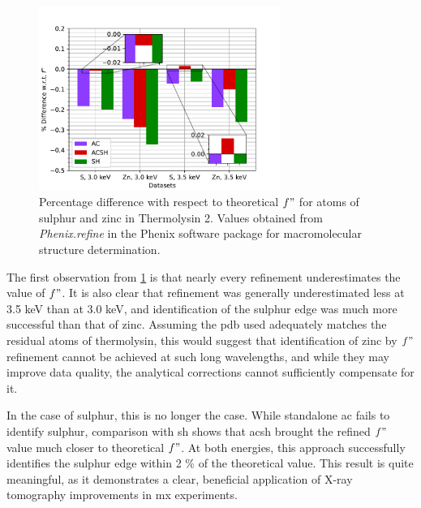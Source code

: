 \begin{figure}[h]
    \centering
    \includegraphics[width = 0.7\textwidth]{plots/exp1/tlys_2_P6122/FDP_percent_diff.pdf}
    \caption{Percentage difference with respect to theoretical $f"$ for atoms of sulphur and zinc in Thermolysin 2. Values obtained from \textit{Phenix.refine} in the Phenix software package for macromolecular structure determination.}
    \label{fig:phenix_plot}
\end{figure}

The first observation from \cref{fig:phenix_plot} is that nearly every refinement underestimates the value of $f"$. It is also clear that refinement was generally underestimated less at 3.5 \unit{keV} than at 3.0 \unit{keV}, and identification of the sulphur edge was much more successful than that of zinc. Assuming the \ac{pdb} used adequately matches the residual atoms of thermolysin, this would suggest that identification of zinc by $f"$ refinement cannot be achieved at such long wavelengths, and while they may improve data quality, the analytical corrections cannot sufficiently compensate for it. %

In the case of sulphur, this is no longer the case. While standalone \ac{ac} fails to identify sulphur, comparison with \ac{sh} shows that \ac{acsh} brought the refined $f"$ value much closer to theoretical $f"$. At both energies, this approach successfully identifies the sulphur edge within 2 \% of the theoretical value. This result is quite meaningful, as it demonstrates a clear, beneficial application of X-ray tomography improvements in \ac{mx} experiments.%

